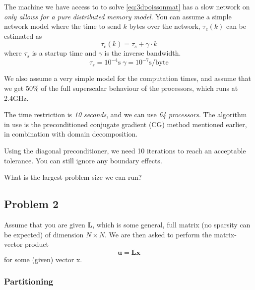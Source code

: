 \begin{question}
  The machine we have access to to solve \eqref{eq:3dpoissonmat} has a slow network on \emph{only allows for a pure distributed memory model}. You can assume a simple network model where the time to send $k$ bytes over the network, $\tau_c(k)$ can be estimated as
  \begin{equation}
    \tau_c(k) = \tau_s + \gamma \cdot k
  \end{equation}
  where $\tau_s$ is a startup time and $\gamma$ is the inverse bandwidth.
  \[
    \tau_s = 10^{-4}\mathrm{s} \; \gamma = 10^{-7}\mathrm{s/byte}
  \]

  We also assume a very simple model for the computation times, and assume that we get 50\% of the full superscalar behaviour of the processors, which runs at 2.4GHz.

  The time restriction is \emph{10 seconds}, and we can use \emph{64 processors}. The algorithm in use is the preconditioned conjugate gradient (CG) method mentioned earlier, in combination with domain decomposition.

  Using the diagonal preconditioner, we need 10 iterations to reach an acceptable tolerance. You can still ignore any boundary effects.

  What is the largest problem size we can run?
\end{question}



\clearpage
\subsection{Problem 2} %
\label{sub:problem_2}


\begin{question}
  Assume that you are given $\mathbf{L}$, which is some general, full matrix (no sparsity can be expected) of dimension $N\times N$. We are then asked to perform the matrix-vector product
  \begin{equation}
    \mathbf{u} = \mathbf{Lx}
  \end{equation}
  for some (given) vector x.
\end{question}

\subsubsection{Partitioning} %
\label{ssub:partitioning}


